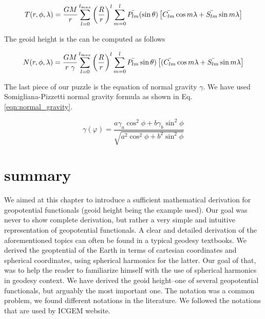  \begin{equation}
 \label{eqn:t}
 T(r, \phi, \lambda) = \frac{GM}{r}\sum_{l=0}^{l_{max}}\left(\frac{R}{r}\right)^{l}\sum_{m=0}^{l}\bar{P_{lm}}(\sin \theta)\left[\bar{C_{lm}} \cos m \lambda \\
 + \bar{S_{lm}} \sin m \lambda\right]
 \end{equation}
 
 The geoid height is the can be computed as follows
 
  \begin{equation}
  \label{eqn:n}
  N(r, \phi, \lambda) = \frac{GM}{r\ \gamma}\sum_{l=0}^{l_{max}}\left(\frac{R}{r}\right)^{l}\sum_{m=0}^{l}\bar{P_{lm}}\sin \theta)\left[(\bar{C_{lm}} \cos m \lambda \\
  + \bar{S_{lm}} \sin m \lambda\right]
  \end{equation}
  
  The last piece of our puzzle is the equation of normal gravity $\gamma$. We have used Somigliana-Pizzetti normal gravity formula as shown in Eq. \ref{eqn:normal_gravity}.
  
  \begin{equation}
  \label{eqn:normal_gravity}
  \gamma(\varphi) = \frac{a \gamma_a \cos^2 \phi + b \gamma_b \sin^2\phi}{\sqrt{a^2 \cos^2 \phi + b^2 \sin^2 \phi}}
  \end{equation} 
  
  
  \section{summary}
  
  We aimed at this chapter to introduce a sufficient mathematical derivation for geopotential functionals (geoid height being the example used). Our goal was never to show complete derivation, but rather a very simple and intuitive representation of geopotential functionals. A clear and detailed derivation of the aforementioned topics can often be found in a typical geodesy textbooks. We derived the geoptential of the Earth in terms of cartesian coordinates and spherical coordinates, using spherical harmonics for the latter. Our goal of that, was to help the reader to familiarize himself with the use of spherical harmonics in geodesy context. We have derived the geoid height--one of several geopotential functionals, but arguably the most important one. The notation was a common problem, we found different notations in the literature. We followed the notations that are used by ICGEM website.